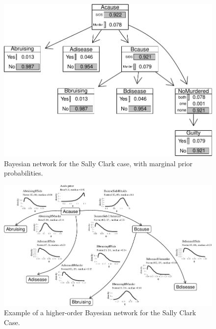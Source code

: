 \documentclass[
  10pt,
  dvipsnames,enabledeprecatedfontcommands]{scrartcl}
\begin{document}
\begin{figure}[H]

\begin{center}\includegraphics[width=0.5\linewidth]{chapter-outline_files/figure-latex/scBNplot2-1} \end{center}
\caption{Bayesian network for the Sally Clark case, with marginal prior probabilities.}
\label{fig:scBNplot}
\end{figure}

\begin{figure}[H]

\begin{center}\includegraphics[width=1.1\linewidth,height=2\textheight,angle=90]{chapter-outline_files/figure-latex/SCwithHOP-1} \end{center}

\caption{Example of a higher-order Bayesian network for the Sally Clark Case.}
\label{fig:SCwithHOP}
\end{figure}
\end{document}
